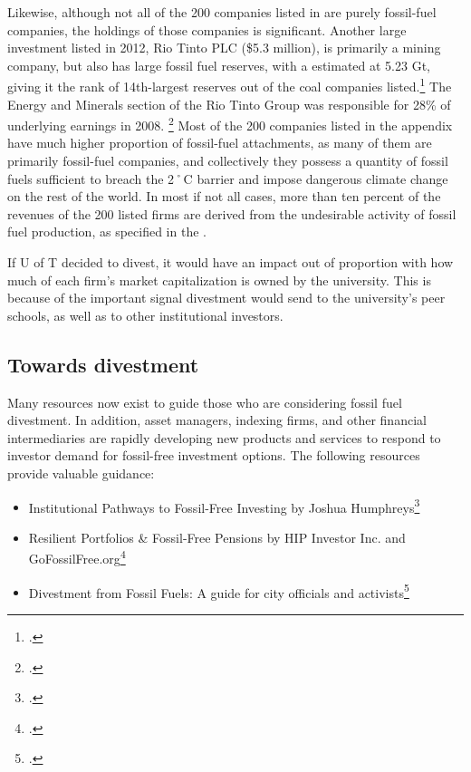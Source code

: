 Likewise, although not all of the 200 companies listed in  are purely fossil-fuel companies, the holdings of those companies is significant.
Another large investment listed in 2012, Rio Tinto PLC (\$5.3 million), is primarily a mining company, but also has large fossil fuel reserves, with a   estimated at 5.23 Gt, giving it the rank of 14th-largest reserves out of the coal companies listed.\footcite{CTI2012}
The Energy and Minerals section of the Rio Tinto Group was responsible for 28\% of underlying earnings in 2008. \footcite{RioTintoChartbook}
Most of the 200 companies listed in the appendix have much higher proportion of fossil-fuel attachments, as many of them are primarily fossil-fuel companies, and collectively they possess a quantity of fossil fuels sufficient to breach the 2˚C barrier and impose dangerous climate change on the rest of the world.
In most if not all cases, more than ten percent of the revenues of the 200 listed firms are derived from the undesirable activity of fossil fuel production, as specified in the .



If U of T decided to divest, it would have an impact out of proportion with how much of each firm's market capitalization is owned by the university.
This is because of the important signal divestment would send to the university's peer schools, as well as to other institutional investors.



		\subsection{Towards divestment}



Many resources now exist to guide those who are considering fossil fuel divestment. 
In addition, asset managers, indexing firms, and other financial intermediaries are rapidly developing new products and services to respond to investor demand for fossil-free investment options.
The following resources provide valuable guidance:
\begin{itemize}
	\item Institutional Pathways to Fossil-Free Investing by Joshua Humphreys\footcite[][]{FossilFreeInvesting}
	\item Resilient Portfolios \& Fossil-Free Pensions by HIP Investor Inc. and GoFossilFree.org\footcite[][]{ResPortFFPensions}
	\item Divestment from Fossil Fuels: A guide for city officials and activists\footcite[][]{MayorsInnovationDivestGuide}
\end{itemize}



